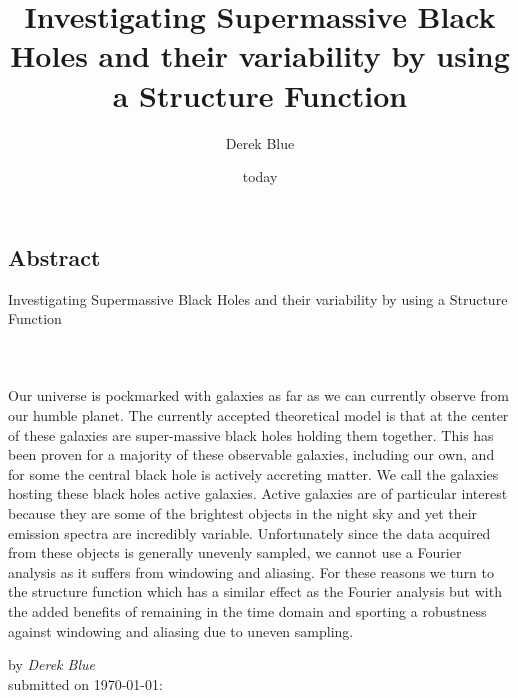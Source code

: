 \documentclass[12pt, oneside]{smuthesis}
\newcommand{\myTitle}{Investigating Supermassive Black Holes and their variability by using a Structure Function}
\begin{document}
\frontmatter
\title{\sc \myTitle}
\author{Derek Blue}
\date{today}
\medskip

\maketitle
\pagestyle{headings}

\begin{center}
\section*{\center \sc Abstract}
\sc \myTitle
\paragraph*{\center  \\}
\end{center}
Our universe is pockmarked with galaxies as far as we can currently observe from our humble planet. The currently accepted theoretical model is that at the center of these galaxies are super-massive black holes holding them together. This has been proven for a majority of these observable galaxies, including our own, and for some the central black hole is actively accreting matter. We call the galaxies hosting these black holes active galaxies. Active galaxies are of particular interest because they are some of the brightest objects in the night sky and yet their emission spectra are incredibly variable. Unfortunately since the data acquired from these objects is generally unevenly sampled, we cannot use a Fourier analysis as it suffers from windowing and aliasing. For these reasons we turn to the structure function which has a similar effect as the Fourier analysis but with the added benefits of remaining in the time domain and sporting a robustness against windowing and aliasing due to uneven sampling.

\begin{center}
by {\em Derek Blue}\\
submitted on \today:\\
\end{center}
\newpage

\tableofcontents
\listoffigures
\listoftables
\newpage
%
\mainmatter
\end{document}
